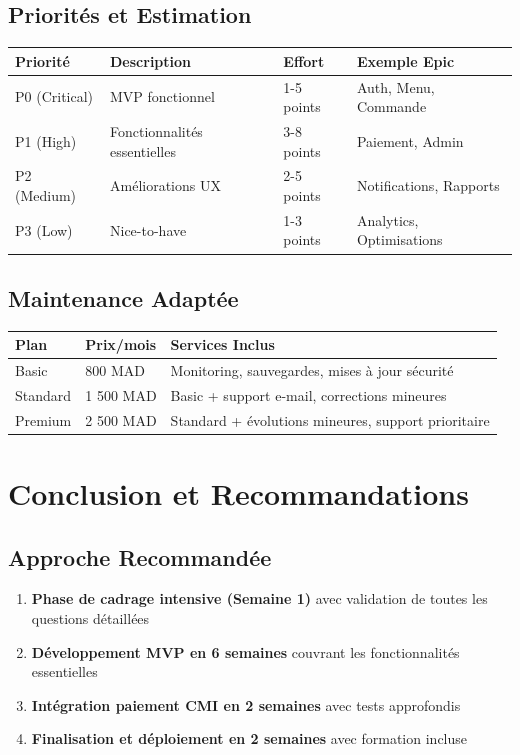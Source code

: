 \documentclass[11pt,a4paper]{article}
\begin{document}
\subsection{Priorités et Estimation}

\begin{longtable}{|p{2cm}|p{4cm}|p{3cm}|p{4cm}|}
\hline
\textbf{Priorité} & \textbf{Description} & \textbf{Effort} & \textbf{Exemple Epic} \\
\hline
P0 (Critical) & MVP fonctionnel & 1-5 points & Auth, Menu, Commande \\
\hline
P1 (High) & Fonctionnalités essentielles & 3-8 points & Paiement, Admin \\
\hline
P2 (Medium) & Améliorations UX & 2-5 points & Notifications, Rapports \\
\hline
P3 (Low) & Nice-to-have & 1-3 points & Analytics, Optimisations \\
\hline
\end{longtable}

\subsection{Maintenance Adaptée}

\begin{longtable}{|p{4cm}|p{3cm}|p{6cm}|}
\hline
\textbf{Plan} & \textbf{Prix/mois} & \textbf{Services Inclus} \\
\hline
Basic & 800 MAD & Monitoring, sauvegardes, mises à jour sécurité \\
\hline
Standard & 1 500 MAD & Basic + support e-mail, corrections mineures \\
\hline
Premium & 2 500 MAD & Standard + évolutions mineures, support prioritaire \\
\hline
\end{longtable}

\section{Conclusion et Recommandations}

\subsection{Approche Recommandée}

\begin{enumerate}
    \item \textbf{Phase de cadrage intensive (Semaine 1)} avec validation de toutes les questions détaillées
    \item \textbf{Développement MVP en 6 semaines} couvrant les fonctionnalités essentielles
    \item \textbf{Intégration paiement CMI en 2 semaines} avec tests approfondis
    \item \textbf{Finalisation et déploiement en 2 semaines} avec formation incluse
\end{enumerate}
\end{document}
